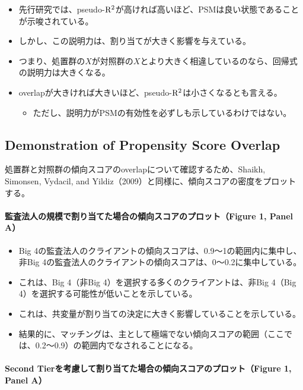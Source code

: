 \begin{itemize}
 \item 先行研究では、pseudo-${\rm R^2}$が高ければ高いほど、PSMは良い状態であることが示唆されている。
 \item しかし、この説明力は、割り当てが大きく影響を与えている。
 \item つまり、処置群の$X$が対照群の$X$とより大きく相違しているのなら、回帰式の説明力は大きくなる。
 \item overlapが大きければ大きいほど、pseudo-${\rm R^2}$は小さくなるとも言える。
  \begin{itemize}
   \item ただし、説明力がPSMの有効性を必ずしも示しているわけではない。
  \end{itemize}
\end{itemize}

\subsection*{Demonstration of Propensity Score Overlap}

処置群と対照群の傾向スコアのoverlapについて確認するため、Shaikh, Simonsen, Vydacil, and Yildiz（2009）と同様に、傾向スコアの密度をプロットする。

\paragraph{監査法人の規模で割り当てた場合の傾向スコアのプロット（Figure 1, Panel A）}

\begin{itemize}
 \item Big 4の監査法人のクライアントの傾向スコアは、0.9〜1の範囲内に集中し、非Big 4の監査法人のクライアントの傾向スコアは、0〜0.2に集中している。
 \item これは、Big 4（非Big 4）を選択する多くのクライアントは、非Big 4（Big 4）を選択する可能性が低いことを示している。
 \item これは、共変量が割り当ての決定に大きく影響していることを示している。
 \item 結果的に、マッチングは、主として極端でない傾向スコアの範囲（ここでは、0.2〜0.9）の範囲内でなされることになる。
\end{itemize}

\paragraph{Second Tierを考慮して割り当てた場合の傾向スコアのプロット（Figure 1, Panel A）}


